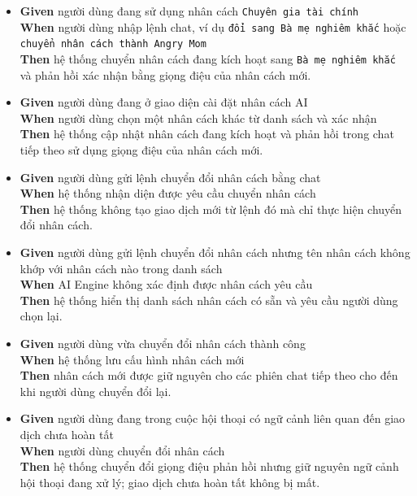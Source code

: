 \begin{itemize}
\item \textbf{Given} người dùng đang sử dụng nhân cách \texttt{Chuyên gia tài chính}  \\ \hspace*{1.5em}  \textbf{When} người dùng nhập lệnh chat, ví dụ \texttt{đổi sang Bà mẹ nghiêm khắc} hoặc \texttt{chuyển nhân cách thành Angry Mom}  \\ \hspace*{1.5em}  \textbf{Then} hệ thống chuyển nhân cách đang kích hoạt sang \texttt{Bà mẹ nghiêm khắc} và phản hồi xác nhận bằng giọng điệu của nhân cách mới.
\item \textbf{Given} người dùng đang ở giao diện cài đặt nhân cách AI  \\ \hspace*{1.5em}  \textbf{When} người dùng chọn một nhân cách khác từ danh sách và xác nhận  \\ \hspace*{1.5em}  \textbf{Then} hệ thống cập nhật nhân cách đang kích hoạt và phản hồi trong chat tiếp theo sử dụng giọng điệu của nhân cách mới.
\item \textbf{Given} người dùng gửi lệnh chuyển đổi nhân cách bằng chat  \\ \hspace*{1.5em}  \textbf{When} hệ thống nhận diện được yêu cầu chuyển nhân cách  \\ \hspace*{1.5em}  \textbf{Then} hệ thống không tạo giao dịch mới từ lệnh đó mà chỉ thực hiện chuyển đổi nhân cách.
\item \textbf{Given} người dùng gửi lệnh chuyển đổi nhân cách nhưng tên nhân cách không khớp với nhân cách nào trong danh sách  \\ \hspace*{1.5em}  \textbf{When} AI Engine không xác định được nhân cách yêu cầu  \\ \hspace*{1.5em}  \textbf{Then} hệ thống hiển thị danh sách nhân cách có sẵn và yêu cầu người dùng chọn lại.
\item \textbf{Given} người dùng vừa chuyển đổi nhân cách thành công  \\ \hspace*{1.5em}  \textbf{When} hệ thống lưu cấu hình nhân cách mới  \\ \hspace*{1.5em}  \textbf{Then} nhân cách mới được giữ nguyên cho các phiên chat tiếp theo cho đến khi người dùng chuyển đổi lại.
\item \textbf{Given} người dùng đang trong cuộc hội thoại có ngữ cảnh liên quan đến giao dịch chưa hoàn tất  \\ \hspace*{1.5em}  \textbf{When} người dùng chuyển đổi nhân cách  \\ \hspace*{1.5em}  \textbf{Then} hệ thống chuyển đổi giọng điệu phản hồi nhưng giữ nguyên ngữ cảnh hội thoại đang xử lý; giao dịch chưa hoàn tất không bị mất.
\end{itemize}
